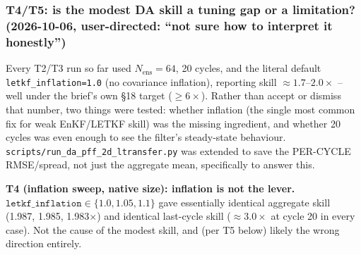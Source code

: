 \documentclass[11pt]{article}
\begin{document}
\subsubsection*{T4/T5: is the modest DA skill a tuning gap or a limitation?
(2026-10-06, user-directed: ``not sure how to interpret it honestly'')}
Every T2/T3 run so far used $N_{\mathrm{ens}}{=}64$, 20 cycles, and the
literal default \texttt{letkf\_inflation=1.0} (no covariance inflation),
reporting skill $\approx1.7$--$2.0\times$ -- well under the brief's own
\S18 target ($\ge6\times$). Rather than accept or dismiss that number,
two things were tested: whether inflation (the single most common fix
for weak EnKF/LETKF skill) was the missing ingredient, and whether 20
cycles was even enough to see the filter's steady-state behaviour.
\texttt{scripts/run\_da\_pff\_2d\_ltransfer.py} was extended to save the
PER-CYCLE RMSE/spread, not just the aggregate mean, specifically to
answer this.

\textbf{T4 (inflation sweep, native size): inflation is not the lever.}
$\texttt{letkf\_inflation}\in\{1.0,1.05,1.1\}$ gave essentially identical
aggregate skill (1.987, 1.985, 1.983$\times$) and identical last-cycle
skill ($\approx3.0\times$ at cycle 20 in every case). Not the cause of
the modest skill, and (per T5 below) likely the wrong direction entirely.
\end{document}
